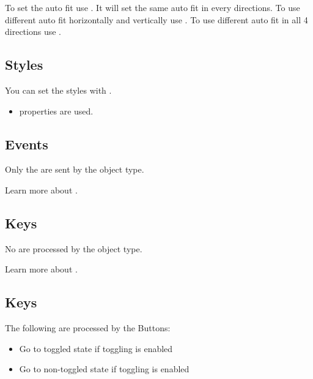 \documentclass[letterpaper,10pt,english]{sphinxmanual}
\begin{document}
To set the auto fit use . It will set the same auto fit in every directions.
To use different auto fit horizontally and vertically use .
To use different auto fit in all 4 directions use .


\subsection{Styles}
\label{\detokenize{object-types/cont:styles}}
You can set the styles with .
\begin{itemize}
\item {} 
 properties are used.

\end{itemize}


\subsection{Events}
\label{\detokenize{object-types/cont:events}}
Only the  are sent by the object type.

Learn more about {\hyperref[\detokenize{overview/events::doc}]{}}.


\subsection{Keys}
\label{\detokenize{object-types/cont:keys}}
No  are processed by the object type.

Learn more about {\hyperref[\detokenize{overview/indev::doc}]{}}.


\subsection{Keys}
\label{\detokenize{object-types/cont:id1}}
The following  are processed by the Buttons:
\begin{itemize}
\item {} 
 Go to toggled state if toggling is enabled

\item {} 
 Go to non-toggled state if toggling is  enabled

\end{itemize}
\end{document}
